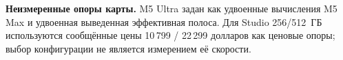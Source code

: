 \textbf{Неизмеренные опоры карты.} 
M5 Ultra задан как удвоенные вычисления M5 Max и удвоенная выведенная эффективная полоса.
Для Studio 256/512~ГБ используются сообщённые цены 10\,799 / 22\,299 долларов как ценовые опоры;
выбор конфигурации не является измерением её скорости.
